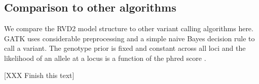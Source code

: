 \documentclass[11pt,reqno]{amsart}
\begin{document}
\subsection{Comparison to other algorithms}

We compare the RVD2 model structure to other variant calling algorithms here. GATK uses considerable preprocessing and a simple naive Bayes decision rule to call a variant. The genotype prior is fixed and constant across all loci and the likelihood of an allele at a locus is a function of the phred score \cite{McKenna2010}.

[XXX Finish this text]





%
%
%
%
%
\end{document}
